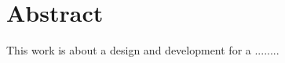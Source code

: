 \chapter{Abstract}
\label{sec:Abstract}


This work is about a design and development for a ........

